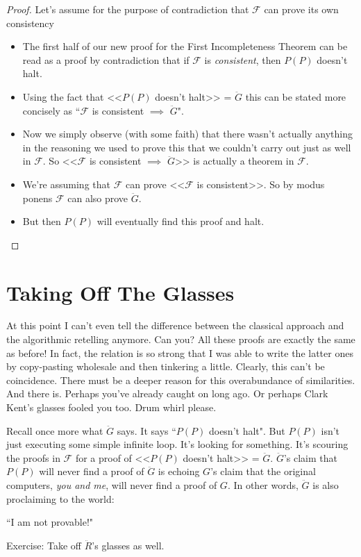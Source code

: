 \documentclass{article}
\theoremstyle{theorem}
\newcommand{\impl}{\item[$\Rightarrow$]}
\begin{document}
\begin{proof}
Let's assume for the purpose of contradiction that $\mathcal{F}$ can prove its own consistency
\begin{itemize}
\impl The first half of our new proof for the First Incompleteness Theorem can be read as a proof by contradiction that if $\mathcal{F}$ is \textit{consistent}, then $P(P)$ doesn't halt.
\impl Using the fact that <<$P(P)$ doesn't halt>> = $\ddot{G}$ this can be stated more concisely as ``$\mathcal{F}$ is consistent $\implies$ $\ddot{G}$".
\impl Now we simply observe (with some faith) that there wasn't actually anything in the reasoning we used to prove this that we couldn't carry out just as well in $\mathcal{F}$. So <<$\mathcal{F}$ is consistent $\implies$ $\ddot{G}$>> is actually a theorem in $\mathcal{F}$.
\impl We're assuming that $\mathcal{F}$ can prove <<$\mathcal{F}$ is consistent>>. So by modus ponens $\mathcal{F}$ can also prove $\ddot{G}$.
\impl But then $P(P)$ will eventually find this proof and halt. \lightning
\end{itemize}
\end{proof}

\section{Taking Off The Glasses}

At this point I can't even tell the difference between the classical approach and the algorithmic retelling anymore. Can you? All these proofs are exactly the same as before! In fact, the relation is so strong that I was able to write the latter ones by copy-pasting wholesale and then tinkering a little. Clearly, this can't be coincidence. There must be a deeper reason for this overabundance of similarities. And there is. Perhaps you've already caught on long ago. Or perhaps Clark Kent's glasses fooled you too. Drum whirl please.

Recall once more what $\ddot{G}$ says. It says ``$P(P)$ doesn't halt". But $P(P)$ isn't just executing some simple infinite loop. It's looking for something. It's scouring the proofs in $\mathcal{F}$ for a proof of <<$P(P)$ doesn't halt>> = $\ddot{G}$. $\ddot{G}$'s claim that $P(P)$ will never find a proof of $\ddot{G}$ is echoing $G$'s claim that the original computers, \textit{you and me}, will never find a proof of $G$. In other words, $\ddot{G}$ is also proclaiming to the world:
\begin{center}
``I am not provable!"
\end{center}
Exercise: Take off $\ddot{R}$'s glasses as well.
\end{document}
